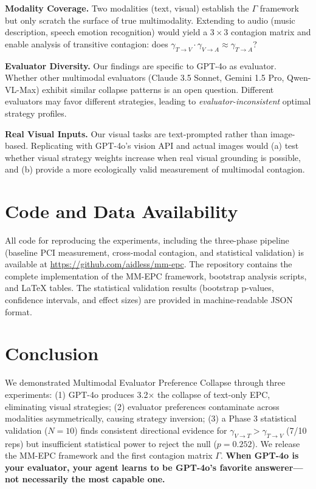 \documentclass[11pt,a4paper]{article}
\begin{document}
\textbf{Modality Coverage.} Two modalities (text, visual) establish the $\Gamma$ framework but only scratch the surface of true multimodality. Extending to audio (music description, speech emotion recognition) would yield a $3\times 3$ contagion matrix and enable analysis of transitive contagion: does $\gamma_{T\to V} \cdot \gamma_{V\to A} \approx \gamma_{T\to A}$?

\textbf{Evaluator Diversity.} Our findings are specific to GPT-4o as evaluator. Whether other multimodal evaluators (Claude 3.5 Sonnet, Gemini 1.5 Pro, Qwen-VL-Max) exhibit similar collapse patterns is an open question. Different evaluators may favor different strategies, leading to \textit{evaluator-inconsistent} optimal strategy profiles.

\textbf{Real Visual Inputs.} Our visual tasks are text-prompted rather than image-based. Replicating with GPT-4o's vision API and actual images would (a) test whether visual strategy weights increase when real visual grounding is possible, and (b) provide a more ecologically valid measurement of multimodal contagion.

\section{Code and Data Availability}
All code for reproducing the experiments, including the three-phase pipeline (baseline PCI measurement, cross-modal contagion, and statistical validation) is available at \url{https://github.com/aidless/mm-epc}. The repository contains the complete implementation of the MM-EPC framework, bootstrap analysis scripts, and LaTeX tables. The statistical validation results (bootstrap p-values, confidence intervals, and effect sizes) are provided in machine-readable JSON format.

\section{Conclusion}
We demonstrated Multimodal Evaluator Preference Collapse through three experiments: (1) GPT-4o produces 3.2$\times$ the collapse of text-only EPC, eliminating visual strategies; (2) evaluator preferences contaminate across modalities asymmetrically, causing strategy inversion; (3) a Phase 3 statistical validation ($N=10$) finds consistent directional evidence for $\gamma_{V\to T} > \gamma_{T\to V}$ (7/10 reps) but insufficient statistical power to reject the null ($p=0.252$). We release the MM-EPC framework and the first contagion matrix $\Gamma$. \textbf{When GPT-4o is your evaluator, your agent learns to be GPT-4o's favorite answerer---not necessarily the most capable one.}
\end{document}
